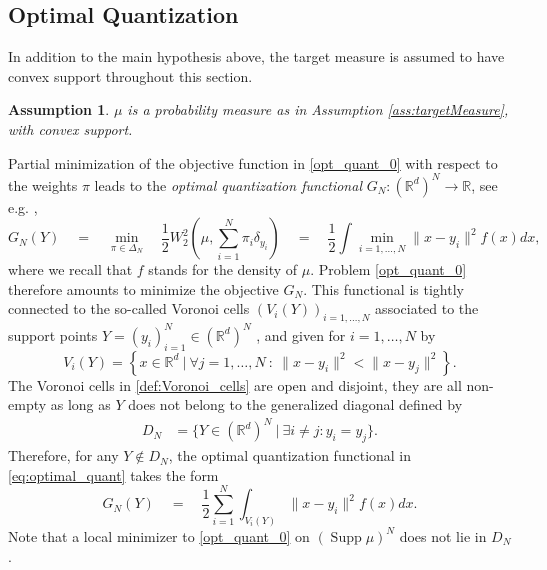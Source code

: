 \documentclass[11pt]{article}
\DeclareMathOperator{\supp}{Supp}
\newcommand{\R}{\mathbb R}
\newcommand{\1}{\mathbbm{1}}
\newtheorem{assumption}{Assumption}
\numberwithin{equation}{section}
\begin{document}
\subsection{Optimal Quantization}
\label{section_optimal_quantization}
In addition to the main hypothesis above, the target measure is assumed to have convex support throughout this section.
\begin{assumption}
	$\mu$ is a probability measure as in Assumption \ref{ass:targetMeasure}, with convex support.
	\label{ass:convexSupport}
\end{assumption}
Partial minimization of the objective function in \eqref{opt_quant_0} with respect to the weights $\pi$ leads to the \emph{optimal quantization functional} $G_N \colon (\R^d)^N \to \R$, see e.g. \cite{Bookquantization},
\begin{equation}
    \label{eq:optimal_quant}
	G_N(Y) \quad = \quad  \underset{\pi \in \Delta_{N}}{\min} \quad \frac{1}{2}W_{2}^{2}\left(\mu,\sum_{i=1}^N \pi_i\delta_{y_i}\right)\quad=\quad \frac{1}{2} \int \min_{i=1,\ldots,N} \|x - y_i\|^2 f(x)dx,
\end{equation}
where we recall that $f$ stands for the density of $\mu$. Problem \eqref{opt_quant_0} therefore amounts to minimize the objective $G_N$. 
This functional is tightly connected to the so-called Voronoi cells $(V_i(Y))_{i=1,\ldots,N}$ associated to the support points $Y = (y_i)_{i=1}^N \in (\mathbb{R}^{d})^N$ \cite[Proposition 3.1]{Lloydoptcvonedimlogconcave2}, and given for $i=1,\ldots,N$ by 
\begin{equation}\label{def:Voronoi_cells}
    V_{i}(Y)=\left\{x\in \mathbb{R}^{d}\:|\: \forall j=1,\ldots,N \: :\:\|x-y_{i}\|^{2} < \|x-y_{j}\|^{2}\right\}.
\end{equation}
The Voronoi cells in \eqref{def:Voronoi_cells} are open and disjoint, they are all non-empty as long as $Y$ does not belong to the generalized diagonal defined by
\begin{align}
	\label{eq:generalizedDiagonal}
	D_{N}&=\{ Y\in (\mathbb{R}^{d})^{N}\: | \: \exists i \ne j: y_{i} = y_{j}\}.
\end{align}
Therefore, for any $Y \not \in D_N$, the optimal quantization functional in \eqref{eq:optimal_quant} takes the form
\begin{equation}
    \label{eq:optimal_quant2}
    G_N(Y) \quad=\quad \frac{1}{2}\sum_{i=1}^{N}\int_{V_{i}(Y)}\|x-y_{i}\|^{2}f(x)dx.
\end{equation}
Note that a local minimizer to \eqref{opt_quant_0} on $(\supp\mu)^N$ does not lie in $D_N$ \cite[Proposition 3.5]{Lloydoptcvonedimlogconcave2}.
\end{document}
